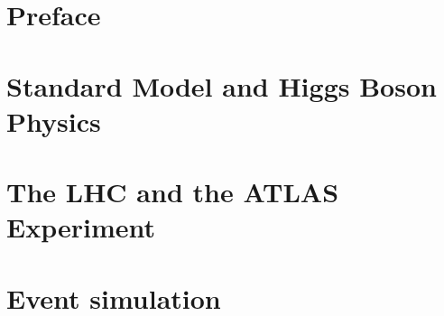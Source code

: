 \documentclass[11pt,twoside]{book}
\begin{document}
\pagestyle{empty}


\cleardoublepage

\pagestyle{fancy}


\hypersetup{linkcolor=black}
\tableofcontents
\clearpage
\hypersetup{linkcolor=blue}


\clearpage



\newpage

\setlength{\parindent}{15pt} %
\setlength{\parskip}{1.2mm plus 0.1mm} %

\chapter*{Preface}
\label{chap:preface}



\clearpage
\chapter{Standard Model and Higgs Boson Physics}
\label{chap:intro}


\chapter{The LHC and the ATLAS Experiment}
\label{chap:ATLAS}


\chapter{Event simulation}
\label{chap:dataset}

\end{document}
